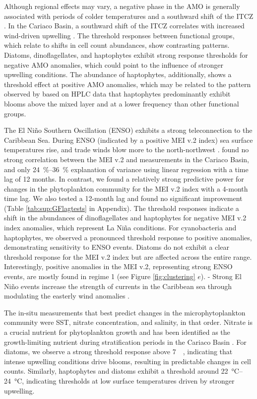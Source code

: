 \documentclass[draft]{agujournal2019}
\begin{document}
Although regional effects may vary, a negative phase in the AMO is generally associated with periods of colder temperatures and a southward shift of the ITCZ \cite{knight_climate_2006, colna2017latitudinal}. In the Cariaco Basin, a southward shift of the ITCZ correlates with increased wind-driven upwelling \cite{taylor_ecosystem_2012}. The threshold responses between functional groups, which relate to shifts in cell count abundances, show contrasting patterns. Diatoms, dinoflagellates, and haptophytes exhibit strong response thresholds for negative AMO anomalies, which could point to the influence of stronger upwelling conditions. The abundance of haptophytes, additionally, shows a threshold effect at positive AMO anomalies, which may be related to the pattern observed by \citeauthor{pinckney_phytoplankton_2015} based on HPLC data that haptophytes predominantly exhibit blooms above the mixed layer and at a lower frequency than other functional groups. 

The El Niño Southern Oscillation (ENSO) exhibits a strong teleconnection to the Caribbean Sea. During ENSO (indicated by a positive MEI v.2 index) sea surface temperatures rise, and trade winds blow more to the north-northwest \cite{enfield_tropical_1997}.  found no strong correlation between the MEI v.2 and measurements in the Cariaco Basin, and only \qtyrange{24}{36}{\%} explanation of variance using linear regression with a time lag of 12 months. In contrast, we found a relatively strong predictive power for changes in the phytoplankton community for the MEI v.2 index with a 4-month time lag. We also tested a 12-month lag and found no significant improvement (Table \ref{tab:sup:GFlagtests} in Appendix).
The threshold responses indicate a shift in the abundances of dinoflagellates and haptophytes for negative MEI v.2 index anomalies, which represent La Niña conditions. For cyanobacteria and haptophytes, we observed a pronounced threshold response to positive anomalies, demonstrating sensitivity to ENSO events. Diatoms do not exhibit a clear threshold response for the MEI v.2 index but are affected across the entire range. Interestingly, positive anomalies in the MEI v.2, representing strong ENSO events, are mostly found in regime 1 (see Figure \ref{fig:clustering} $e$). 
- Strong El Niño events increase the strength of currents in the Caribbean sea through modulating the easterly wind anomalies \cite{huang_enso_2023}.

The in-situ measurements that best predict changes in the microphytoplankton community were SST, nitrate concentration, and salinity, in that order. Nitrate is a crucial nutrient for phytoplankton growth and has been identified as the growth-limiting nutrient during stratification periods in the Cariaco Basin \cite{muller-karger_scientific_2019}. For diatoms, we observe a strong threshold response above \qty{7}{\micro \molar}, indicating that intense upwelling conditions drive blooms, resulting in predictable changes in cell counts. Similarly, haptophytes and diatoms exhibit a threshold around \qtyrange{22}{24}{\celsius}, indicating thresholds at low surface temperatures driven by stronger upwelling.
\end{document}
